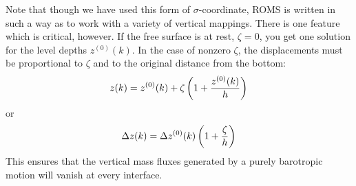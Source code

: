 Note that though we have used this form of $\sigma$-coordinate, ROMS
is written in such a way as to work with a variety of vertical
mappings. There is one feature which is critical, however. If the free
surface is at rest, $\zeta = 0$, you get one solution for the level
depths $z^{(0)}(k)$. In the case of nonzero $\zeta$, the
displacements must be proportional to $\zeta$ and to the original
distance from the bottom:
\begin{equation}
   z(k) =  z^{(0)} (k) + \zeta \left( 1 + {z^{(0)} (k) \over h}
   \right)
\end{equation}
or
\begin{equation}
   \Delta z(k) = \Delta z^{(0)} (k) \left( 1 + {\zeta \over h}
   \right)
\end{equation}
This ensures that the vertical mass fluxes generated by a purely
barotropic motion will vanish at every interface.
